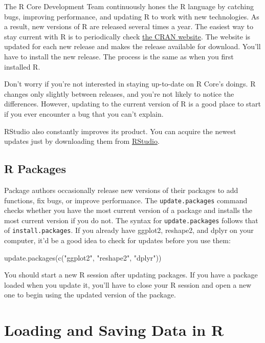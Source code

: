\documentclass[
  letterpaper,
  DIV=11,
  numbers=noendperiod]{scrbook}
\newenvironment{Shaded}{\begin{snugshade}}{\end{snugshade}}
\newcommand{\FunctionTok}[1]{\textcolor[rgb]{0.28,0.35,0.67}{#1}}
\newcommand{\NormalTok}[1]{\textcolor[rgb]{0.00,0.23,0.31}{#1}}
\newcommand{\StringTok}[1]{\textcolor[rgb]{0.13,0.47,0.30}{#1}}
\begin{document}
The R Core Development Team continuously hones the R language by
catching bugs, improving performance, and updating R to work with new
technologies. As a result, new versions of R are released several times
a year. The easiest way to stay current with R is to periodically check
\href{http://cran.r-project.org}{the CRAN website}. The website is
updated for each new release and makes the release available for
download. You'll have to install the new release. The process is the
same as when you first installed R.

Don't worry if you're not interested in staying up-to-date on R Core's
doings. R changes only slightly between releases, and you're not likely
to notice the differences. However, updating to the current version of R
is a good place to start if you ever encounter a bug that you can't
explain.

RStudio also constantly improves its product. You can acquire the newest
updates just by downloading them from
\href{http://www.rstudio.com/ide}{RStudio}.

\section{R Packages}\label{r-packages}

Package authors occasionally release new versions of their packages to
add functions, fix bugs, or improve performance. The
\texttt{update.packages} command checks whether you have the most
current version of a package and installs the most current version if
you do not. The syntax for \texttt{update.packages} follows that of
\texttt{install.packages}. If you already have ggplot2, reshape2, and
dplyr on your computer, it'd be a good idea to check for updates before
you use them:

\begin{Shaded}
\begin{Highlighting}[]
\FunctionTok{update.packages}\NormalTok{(}\FunctionTok{c}\NormalTok{(}\StringTok{"ggplot2"}\NormalTok{, }\StringTok{"reshape2"}\NormalTok{, }\StringTok{"dplyr"}\NormalTok{))}
\end{Highlighting}
\end{Shaded}

You should start a new R session after updating packages. If you have a
package loaded when you update it, you'll have to close your R session
and open a new one to begin using the updated version of the package.

\chapter{Loading and Saving Data in R}\label{sec-appendix-dataio}
\end{document}
